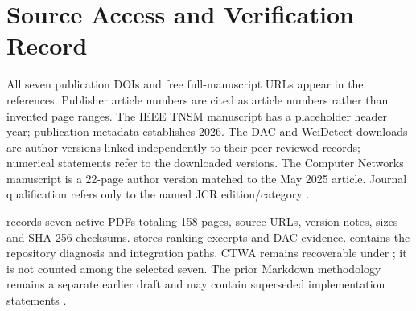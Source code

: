 \documentclass[10pt,a4paper]{article}
\begin{document}
\section{Source Access and Verification Record}
All seven publication DOIs and free full-manuscript URLs appear in the references. Publisher article numbers are cited as article numbers rather than invented page ranges. The IEEE TNSM manuscript has a placeholder header year; publication metadata establishes 2026. The DAC and WeiDetect downloads are author versions linked independently to their peer-reviewed records; numerical statements refer to the downloaded versions. The Computer Networks manuscript is a 22-page author version matched to the May 2025 article. Journal qualification refers only to the named JCR edition/category \cite{carillo,cnd,wei,cerasuolo,jcr,dac}.

 records seven active PDFs totaling 158 pages, source URLs, version notes, sizes and SHA-256 checksums.  stores ranking excerpts and DAC evidence.  contains the repository diagnosis and integration paths. CTWA remains recoverable under ; it is not counted among the selected seven. The prior Markdown methodology remains a separate earlier draft and may contain superseded implementation statements \cite{repo}.
\end{document}
